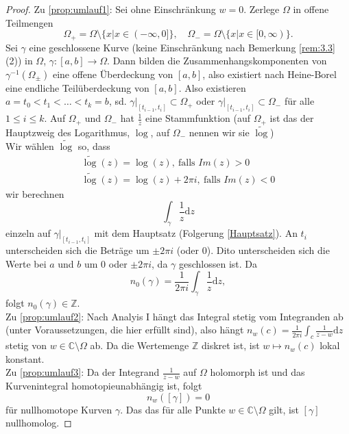 \documentclass[11pt,titlepage]{article}
\theoremstyle{definition}
\theoremstyle{remark}
\begin{document}
	\begin{proof}
		Zu \ref{prop:umlauf1}: Sei ohne Einschränkung $w=0$. Zerlege $\Omega$ in offene Teilmengen 
		\[\Omega_+ =\Omega\setminus\{ x\vert x\in(-\infty,0]\},\quad \Omega_-=\Omega\setminus
		\{x\vert x\in[0,\infty)\}.\]Sei $\gamma$ eine geschlossene Kurve (keine Einschränkung nach 
		Bemerkung \ref{rem:3.3} (2)) in $\Omega$, $\gamma:[a,b]\to\Omega$. Dann bilden die 
		Zusammenhangskomponenten von $\gamma^{-1}(\Omega_{\pm})$ eine offene Überdeckung 
		von $[a,b]$, also existiert nach Heine-Borel eine endliche Teilüberdeckung von $[a,b]$. 
		Also existieren $a=t_0<t_1<\ldots<t_k=b$, sd. $\gamma|_{[t_{i-1},t_i]}\subset\Omega_+$ oder 
		$\gamma|_{[t_{i-1},t_i]}\subset\Omega_-$ für alle $1\leq i\leq k$. Auf $\Omega_+$ und $\Omega_-$ 
		hat $\frac{1}{z}$ eine Stammfunktion (auf $\Omega_+$ ist das der  Hauptzweig des Logarithmus, 
		$\log$, auf $\Omega_-$ nennen wir sie $\tilde{\log}$) \\
		Wir wählen $\tilde{\log}$ so, dass
		\begin{eqnarray*}
			\tilde{\log}(z)=\log(z),\ \text{falls $Im(z)>0$} \\
			\tilde{\log}(z)=\log(z)+2\pi i,\ \text{falls $Im(z)<0$}
		\end{eqnarray*}
		wir berechnen 
		\[ \int_{\gamma} \frac{1}{z}\mathrm{d}z \]
		einzeln auf $\gamma|_{[t_{i-1},t_i]}$ mit dem Hauptsatz 
		(Folgerung \ref{Hauptsatz}). An $t_i$ unterscheiden sich die Beträge um $\pm 2\pi i$ (oder $0$). Dito
		unterscheiden sich die Werte bei $a$ und $b$ um $0$ oder $\pm 2\pi i$, da $\gamma$ geschlossen ist.
		Da \[n_0(\gamma)=\frac{1}{2\pi i}\int_{\gamma} \frac{1}{z}\mathrm{d}z,\]
		folgt $n_0(\gamma)\in\mathbb{Z}$. \\
		
		Zu \ref{prop:umlauf2}: Nach Analyis I hängt das Integral stetig vom Integranden ab (unter 
		Voraussetzungen, die hier erfüllt sind), also hängt 
		$n_w(c)=\frac{1}{2\pi i} \int_c \frac{1}{z-w}\mathrm{d}z$ 
		stetig von $w\in\mathbb{C}\setminus\Omega$ ab.
		Da die Wertemenge $\mathbb{Z}$ diskret ist, ist $w\mapsto n_w(c)$ lokal konstant. \\
		
		Zu \ref{prop:umlauf3}: Da der Integrand $\frac{1}{z-w}$ auf $\Omega$ holomorph ist und das 
		Kurvenintegral homotopieunabhängig ist, folgt 
		\[n_w([\gamma])=0\] für nullhomotope 
		Kurven $\gamma$. Das das für alle Punkte $w\in\mathbb{C}\setminus\Omega$ gilt, ist $[\gamma]$ 
		nullhomolog.
	\end{proof}
	
\end{document}

